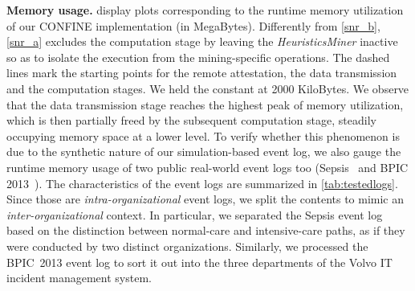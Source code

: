 \noindent\textbf{Memory usage.} \label{sec:evaluation:subsec:MemoryUsage}  display plots corresponding to the runtime memory utilization of our CONFINE implementation (in MegaBytes). Differently from \cref{snr_b}, \cref{snr_a} excludes the computation stage by leaving the \emph{HeuristicsMiner} inactive so as to isolate the execution from the mining-specific operations. %
The dashed lines mark %
the starting points for the remote attestation, the data transmission and the computation stages. %
We held the {\SegSize} constant at \num{2000} KiloBytes. %
We observe that the data transmission stage reaches the highest peak of memory utilization, %
which is then partially freed by the subsequent computation stage, steadily occupying memory space at a lower level. %
To verify whether this phenomenon is due to the synthetic nature of our simulation-based event log, we also gauge the runtime memory usage of two public real-world event logs too (Sepsis~\citep{seps} and BPIC 2013~\citep{bpic2013}). %
The characteristics of the event logs are summarized in \cref{tab:testedlogs}.
Since those are \textit{intra-organizational} event logs, we %
split the contents to mimic an \textit{inter-organizational} context.
In particular, we separated the Sepsis event log based on the distinction between normal-care and intensive-care paths, as if they were conducted by two distinct organizations. Similarly, we processed the BPIC~2013 event log to sort it out into the three departments of the Volvo IT incident management system. %
